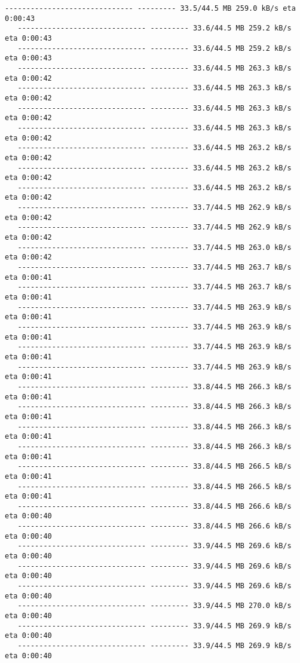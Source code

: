 \documentclass[11pt]{article}
\begin{document}
\begin{Verbatim}[commandchars=\\\{\}]
   ------------------------------ --------- 33.5/44.5 MB 259.0 kB/s eta 0:00:43
   ------------------------------ --------- 33.6/44.5 MB 259.2 kB/s eta 0:00:43
   ------------------------------ --------- 33.6/44.5 MB 259.2 kB/s eta 0:00:43
   ------------------------------ --------- 33.6/44.5 MB 263.3 kB/s eta 0:00:42
   ------------------------------ --------- 33.6/44.5 MB 263.3 kB/s eta 0:00:42
   ------------------------------ --------- 33.6/44.5 MB 263.3 kB/s eta 0:00:42
   ------------------------------ --------- 33.6/44.5 MB 263.3 kB/s eta 0:00:42
   ------------------------------ --------- 33.6/44.5 MB 263.2 kB/s eta 0:00:42
   ------------------------------ --------- 33.6/44.5 MB 263.2 kB/s eta 0:00:42
   ------------------------------ --------- 33.6/44.5 MB 263.2 kB/s eta 0:00:42
   ------------------------------ --------- 33.7/44.5 MB 262.9 kB/s eta 0:00:42
   ------------------------------ --------- 33.7/44.5 MB 262.9 kB/s eta 0:00:42
   ------------------------------ --------- 33.7/44.5 MB 263.0 kB/s eta 0:00:42
   ------------------------------ --------- 33.7/44.5 MB 263.7 kB/s eta 0:00:41
   ------------------------------ --------- 33.7/44.5 MB 263.7 kB/s eta 0:00:41
   ------------------------------ --------- 33.7/44.5 MB 263.9 kB/s eta 0:00:41
   ------------------------------ --------- 33.7/44.5 MB 263.9 kB/s eta 0:00:41
   ------------------------------ --------- 33.7/44.5 MB 263.9 kB/s eta 0:00:41
   ------------------------------ --------- 33.7/44.5 MB 263.9 kB/s eta 0:00:41
   ------------------------------ --------- 33.8/44.5 MB 266.3 kB/s eta 0:00:41
   ------------------------------ --------- 33.8/44.5 MB 266.3 kB/s eta 0:00:41
   ------------------------------ --------- 33.8/44.5 MB 266.3 kB/s eta 0:00:41
   ------------------------------ --------- 33.8/44.5 MB 266.3 kB/s eta 0:00:41
   ------------------------------ --------- 33.8/44.5 MB 266.5 kB/s eta 0:00:41
   ------------------------------ --------- 33.8/44.5 MB 266.5 kB/s eta 0:00:41
   ------------------------------ --------- 33.8/44.5 MB 266.6 kB/s eta 0:00:40
   ------------------------------ --------- 33.8/44.5 MB 266.6 kB/s eta 0:00:40
   ------------------------------ --------- 33.9/44.5 MB 269.6 kB/s eta 0:00:40
   ------------------------------ --------- 33.9/44.5 MB 269.6 kB/s eta 0:00:40
   ------------------------------ --------- 33.9/44.5 MB 269.6 kB/s eta 0:00:40
   ------------------------------ --------- 33.9/44.5 MB 270.0 kB/s eta 0:00:40
   ------------------------------ --------- 33.9/44.5 MB 269.9 kB/s eta 0:00:40
   ------------------------------ --------- 33.9/44.5 MB 269.9 kB/s eta 0:00:40

\end{Verbatim}
\end{document}
